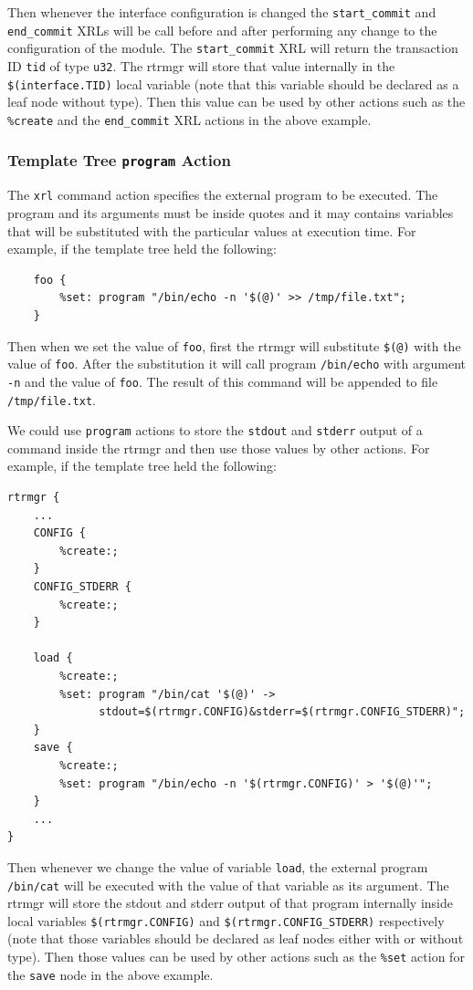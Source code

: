 \documentclass[11pt]{article}
\begin{document}
Then whenever the interface configuration is changed the {\tt start\_commit}
and {\tt end\_commit} XRLs will be call before and after performing any change
to the configuration of the module. The {\tt start\_commit} XRL will return
the transaction ID {\tt tid} of type {\tt u32}. The rtrmgr will store
that value internally in the {\tt \$(interface.TID)} local variable
(note that this variable should be declared as a leaf node without type).
Then this value can be used by other actions such as the
{\tt \%create} and the {\tt end\_commit} XRL actions in the above example.

\subsubsection{Template Tree {\tt program} Action}

The {\tt xrl} command action specifies the external program to be executed.
The program and its arguments must be inside quotes and it may contains
variables that will be substituted with the particular values at execution
time.
For example, if the template tree held the following:

\begin{verbatim}
    foo {
        %set: program "/bin/echo -n '$(@)' >> /tmp/file.txt";
    }
\end{verbatim}

Then when we set the value of {\tt foo}, first the rtrmgr will substitute
{\tt \$(@)} with the value of {\tt foo}. After the substitution it will
call program {\tt /bin/echo} with argument {\tt -n} and the value
of {\tt foo}. The result of this command will be appended to file
{\tt /tmp/file.txt}.

We could use {\tt program} actions to store the {\tt stdout} and {\tt stderr}
output of a command inside the rtrmgr and then use those values by other
actions.
For example, if the template tree held the following:

\begin{verbatim}
rtrmgr {
    ...
    CONFIG {
        %create:;
    }
    CONFIG_STDERR {
        %create:;
    }

    load {
        %create:;
        %set: program "/bin/cat '$(@)' ->
              stdout=$(rtrmgr.CONFIG)&stderr=$(rtrmgr.CONFIG_STDERR)";
    }
    save {
        %create:;
        %set: program "/bin/echo -n '$(rtrmgr.CONFIG)' > '$(@)'";
    }
    ...
}
\end{verbatim}

Then whenever we change the value of variable {\tt load}, the external
program {\tt /bin/cat} will be executed with the value of that variable as
its argument. The rtrmgr will store the stdout and stderr output of
that program internally inside local variables {\tt \$(rtrmgr.CONFIG)}
and {\tt \$(rtrmgr.CONFIG\_STDERR)} respectively (note that those variables
should be declared as leaf nodes either with or without type).
Then those values can be used by other actions such as the {\tt \%set}
action for the {\tt save} node in the above example.
\end{document}
